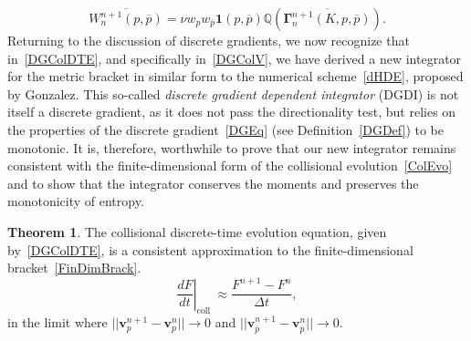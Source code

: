 \documentclass[preprint,12pt]{elsarticle}
\theoremstyle{definition}
\newtheorem{theorem}{Theorem}[section]
\begin{document}
\begin{equation}
\overline{W_{n}^{n+1}(p, \overline{p})}=\nu w_{p} w_{\overline{p}} \boldsymbol{1}(p, \overline{p}) \mathbb{Q}\left(\overline{\boldsymbol{\Gamma}_{n}^{n+1}(K, p, \overline{p})}\right).
\label{WDGmat}
\end{equation}
Returning to the discussion of discrete gradients, we now recognize that in~\eqref{DGColDTE}, and specifically in~\eqref{DGColV}, we have derived a new integrator for the metric bracket in similar form to the numerical scheme~\eqref{dHDE}, proposed by Gonzalez. 
This so-called \textit{discrete gradient dependent integrator} (DGDI) is not itself a discrete gradient, as it does not pass the directionality test, but relies on the properties of the discrete gradient~\eqref{DGEq} (see Definition~\eqref{DGDef}) to be monotonic. It is, therefore, worthwhile to prove that our new integrator remains consistent with the finite-dimensional form of the collisional evolution~\eqref{ColEvo} and to show that the integrator conserves the moments and preserves the monotonicity of entropy.

\begin{theorem}
The collisional discrete-time evolution equation, given by~\eqref{DGColDTE}, is a consistent approximation to the finite-dimensional bracket~\eqref{FinDimBrack}. \\
\begin{equation}
\left. \frac{d F}{d t}\right|_{\text {coll }} \approx \frac{F^{n+1} - F^{n}}{\Delta t},
\end{equation}
in the limit where $||\boldsymbol{v}_{p}^{n+1} - \boldsymbol{v}_{p}^{n}|| \rightarrow 0$ and $||\boldsymbol{v}_{\overline{p}}^{n+1} - \boldsymbol{v}_{\overline{p}}^{n}|| \rightarrow 0$.
\end{theorem}
\end{document}
